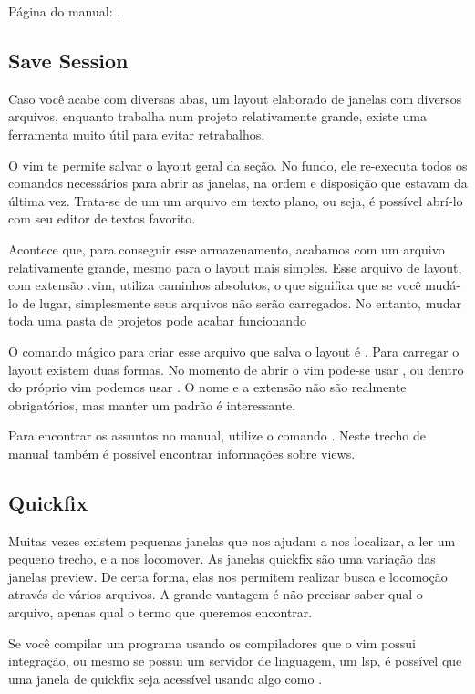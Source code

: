 \documentclass[a4paper, 12pt]{article}
\begin{document}
Página do manual: .

\subsection{Save Session}
Caso você acabe com diversas abas, um layout elaborado de janelas com diversos arquivos,
enquanto trabalha num projeto relativamente grande, existe uma ferramenta muito útil para evitar
retrabalhos.

O vim te permite salvar o layout geral da seção.
No fundo, ele re-executa todos os comandos necessários para abrir as janelas,
na ordem e disposição que estavam da última vez.
Trata-se de um um arquivo em texto plano, ou seja, é possível abrí-lo com seu editor de textos favorito.

Acontece que, para conseguir esse armazenamento, acabamos com um arquivo relativamente grande,
mesmo para o layout mais simples.
Esse arquivo de layout, com extensão .vim, utiliza caminhos absolutos,
o que significa que se você mudá-lo de lugar, simplesmente seus arquivos não serão carregados.
No entanto, mudar toda uma pasta de projetos pode acabar funcionando

O comando mágico para criar esse arquivo que salva o layout é .
Para carregar o layout existem duas formas.
No momento de abrir o vim pode-se usar , ou dentro do próprio vim
podemos usar .
O nome e a extensão não são realmente obrigatórios, mas manter um padrão é interessante.

Para encontrar os assuntos no manual, utilize o comando .
Neste trecho de manual também é possível encontrar informações sobre views.

\subsection{Quickfix}
Muitas vezes existem pequenas janelas que nos ajudam a nos localizar, a ler um pequeno trecho, e a nos locomover.
As janelas quickfix são uma variação das janelas preview.
De certa forma, elas nos permitem realizar busca e locomoção através de vários arquivos.
A grande vantagem é não precisar saber qual o arquivo, apenas qual o termo que queremos encontrar.

Se você compilar um programa usando os compiladores que o vim possui integração, ou mesmo se possui um servidor de linguagem,
um lsp, é possível que uma janela de quickfix seja acessível usando algo como .
\end{document}
